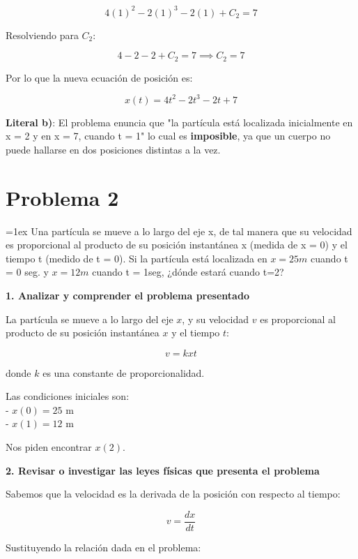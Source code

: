 \documentclass[answers]{exam}
\edef\svparindent{\the\parindent}
\newenvironment{specindent}
  {\par\everypar{\leftskip=\svparindent\relax}\parindent=0pt\relax\parskip=1ex}
  {\vspace{\parskip}\par}
\begin{document}
\[
	4(1)^2 - 2(1)^3 - 2(1) + C_2 = 7
\]

Resolviendo para \( C_2 \):

\[
	4 - 2 - 2 + C_2 = 7 \implies C_2 = 7
\]

Por lo que la nueva ecuación de posición es:

\[
	x(t) = 4t^2 - 2t^3 - 2t + 7
\]

\textbf{Literal b)}: El problema enuncia que "la partícula está localizada inicialmente en x = 2 y en x = 7, cuando t = 1" lo cual es \textbf{imposible}, ya que un cuerpo no puede hallarse en dos posiciones distintas a la vez.

\section*{Problema 2}

\begin{specindent}
	Una partícula se mueve a lo largo del eje x, de tal manera que su velocidad es proporcional
	al producto de su posición instantánea x (medida de x = 0) y el tiempo t (medido de t = 0). Si
	la partícula está localizada en $x = 25 m$ cuando t = 0 seg. y $x = 12 m$ cuando t = 1seg, ¿dónde
	estará cuando t=2?
	
\end{specindent}

\vspace{1em}
\textbf{1. Analizar y comprender el problema presentado}

La partícula se mueve a lo largo del eje \( x \), y su velocidad \( v \) es proporcional al producto de su posición instantánea \( x \) y el tiempo \( t \):

\[
	v = k x t
\]

donde \( k \) es una constante de proporcionalidad.

Las condiciones iniciales son:\\
- \( x(0) = 25 \) m\\
- \( x(1) = 12 \) m

Nos piden encontrar \( x(2) \).

\newpage

\textbf{2. Revisar o investigar las leyes físicas que presenta el problema}

Sabemos que la velocidad es la derivada de la posición con respecto al tiempo:

\[
	v = \frac{dx}{dt}
\]

Sustituyendo la relación dada en el problema:
\end{document}
